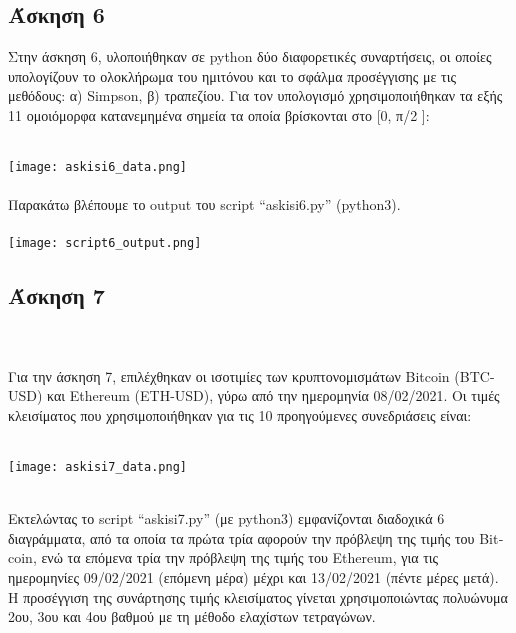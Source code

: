 \documentclass{article}
\begin{document}
\begin{center}
\section*{Άσκηση 6}
\end{center}

Στην άσκηση 6, υλοποιήθηκαν σε \textlatin{python} δύο διαφορετικές συναρτήσεις, οι οποίες υπολογίζουν το ολοκλήρωμα του ημιτόνου και το σφάλμα προσέγγισης με τις μεθόδους: α) \textlatin{Simpson}, β) τραπεζίου. Για τον υπολογισμό χρησιμοποιήθηκαν τα εξής 11 ομοιόμορφα κατανεμημένα σημεία τα οποία βρίσκονται στο [0, π/2 ]: \\~\\
\begin{center}
    \texttt{[image: askisi6\_data.png]} \\~\\
    Παρακάτω βλέπουμε το \textlatin{output} του \textlatin{script “askisi6.py” (python3).} \\~\\
    \texttt{[image: script6\_output.png]}
\end{center}
\pagebreak
\begin{center}
\section*{Άσκηση 7}
\end{center} \\~\\
Για την άσκηση 7, επιλέχθηκαν οι ισοτιμίες των κρυπτονομισμάτων \textlatin{Bitcoin (BTC-USD)} και \textlatin{Ethereum (ETH-USD)}, γύρω από την ημερομηνία 08/02/2021. Οι τιμές κλεισίματος που χρησιμοποιήθηκαν για τις 10 προηγούμενες συνεδριάσεις είναι: \\~\\
\begin{center}
    \texttt{[image: askisi7\_data.png]} \\~\\
\end{center}
Εκτελώντας το \textlatin{script “askisi7.py”} (με \textlatin{python3}) εμφανίζονται διαδοχικά 6 διαγράμματα, από τα οποία τα πρώτα τρία αφορούν την πρόβλεψη της τιμής του \textlatin{Bitcoin}, ενώ τα επόμενα τρία την πρόβλεψη της τιμής του \textlatin{Ethereum}, για τις ημερομηνίες 09/02/2021 (επόμενη μέρα) μέχρι και 13/02/2021 (πέντε μέρες μετά). Η προσέγγιση της συνάρτησης τιμής κλεισίματος γίνεται χρησιμοποιώντας πολυώνυμα 2ου, 3ου  και 4ου βαθμού με τη μέθοδο ελαχίστων τετραγώνων. \\~\\
\end{document}
